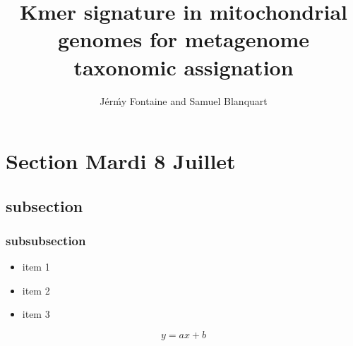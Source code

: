 \documentclass[a4wide,10pt]{article}
\title{Kmer signature in mitochondrial genomes for metagenome taxonomic assignation}
\author{J\'er\'my Fontaine and Samuel Blanquart}
\begin{document}
\maketitle

\section{Section Mardi 8 Juillet}

\subsection{subsection}

\subsubsection{subsubsection}

\begin{itemize}
\item item 1
\item item 2
\item item 3
\end{itemize}

\begin{equation}
y=ax+b
\end{equation}

\end{document}
